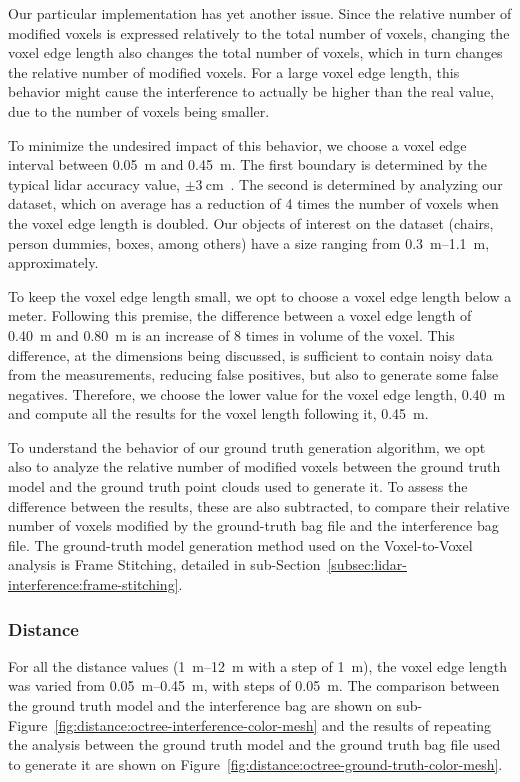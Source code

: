 Our particular implementation has yet another issue. Since the relative number of modified voxels is expressed relatively to the total number of voxels, changing the voxel edge length also changes the total number of voxels, which in turn changes the relative number of modified voxels. For a large voxel edge length, this behavior might cause the interference to actually be higher than the real value, due to the number of voxels being smaller. 

To minimize the undesired impact of this behavior, we choose a voxel edge interval between \SI{0.05}{\meter} and \SI{0.45}{\meter}. The first boundary is determined by the typical \ac{lidar} accuracy value, $\pm\SI{3}{\centi\meter}$~\cite{VLP16}. The second is determined by analyzing our dataset, which on average has a reduction of 4 times the number of voxels when the voxel edge length is doubled. Our objects of interest on the dataset (chairs, person dummies, boxes, among others) have a size ranging from \SIrange{0.3}{1.1}{\meter}, approximately. 

To keep the voxel edge length small, we opt to choose a voxel edge length below a meter. Following this premise, the difference between a voxel edge length of \SI{0.40}{\meter} and \SI{0.80}{\meter} is an increase of 8 times in volume of the voxel. This difference, at the dimensions being discussed, is sufficient to contain noisy data from the measurements, reducing false positives, but also to generate some false negatives. Therefore, we choose the lower value for the voxel edge length, \SI{0.40}{\meter} and compute all the results for the voxel length following it, \SI{0.45}{\meter}.

To understand the behavior of our ground truth generation algorithm, we opt also to analyze the relative number of modified voxels between the ground truth model and the ground truth point clouds used to generate it. To assess the difference between the results, these are also subtracted, to compare their relative number of voxels modified by the ground-truth bag file and the interference bag file. The ground-truth model generation method used on the Voxel-to-Voxel analysis is Frame Stitching, detailed in sub-Section~\ref{subsec:lidar-interference:frame-stitching}.

\subsubsection{Distance}
For all the distance values (\SIrange{1}{12}{\meter} with a step of \SI{1}{\meter}), the voxel edge length was varied from \SIrange{0.05}{0.45}{\meter}, with steps of \SI{0.05}{\meter}. The comparison between the ground truth model and the interference bag are shown on sub-Figure~\ref{fig:distance:octree-interference-color-mesh} and the results of repeating the analysis between the ground truth model and the ground truth bag file used to generate it are shown on Figure~\ref{fig:distance:octree-ground-truth-color-mesh}. 


